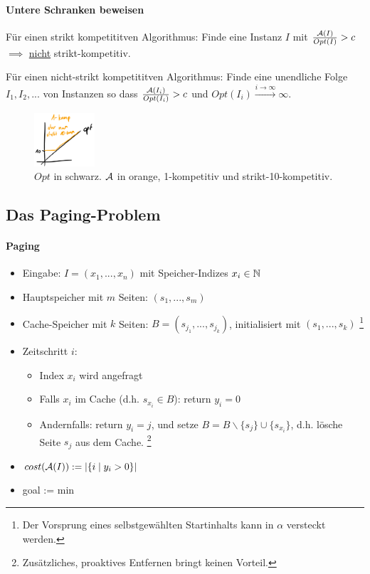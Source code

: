 \paragraph{Untere Schranken beweisen}
Für einen strikt kompetititven Algorithmus:
Finde eine Instanz $I$ mit $\frac{\mathcal{A}(I)}{Opt(I)} > c$ $\implies$ \underline{nicht} strikt-kompetitiv.

Für einen nicht-strikt kompetititven Algorithmus:
Finde eine unendliche Folge $I_1, I_2, ...$ von Instanzen so dass $\frac{\mathcal{A}(I_i)}{Opt(I_i)} > c$
und $Opt(I_i) \overset{i \rightarrow \infty}{\longrightarrow} \infty $.

\begin{figure}[h]
    \centering
    \includegraphics[width=0.2\textwidth]{images/strikt-kompetitiv.png}
    \caption{$Opt$ in schwarz. $\mathcal{A}$ in orange, 1-kompetitiv und strikt-10-kompetitiv.}
\end{figure}


\subsection{Das Paging-Problem}

\paragraph{Paging}
\begin{itemize}
    \item Eingabe: $ I = (x_1, ..., x_n)$ mit Speicher-Indizes $x_i \in \mathbb{N}$
    \item Hauptspeicher mit $m$ Seiten: $ (s_1, ..., s_m) $
    \item Cache-Speicher mit $k$ Seiten: $ B = (s_{j_1}, ..., s_{j_k}) $, initialisiert mit $ (s_1, ..., s_k) $
        \footnote{Der Vorsprung eines selbstgewählten Startinhalts kann in $\alpha$ versteckt werden.}
    \item Zeitschritt $i$:
    \begin{itemize}
        \item Index $x_i$ wird angefragt
        \item Falls $x_i$ im Cache (d.h. $s_{x_i} \in B$): return $y_i=0$
        \item Andernfalls: return $y_i=j$, und setze $B = B \backslash  \{s_j\} \cup \{s_{x_i}\} $,
            d.h. lösche Seite $s_j$ aus dem Cache.
            \footnote{Zusätzliches, proaktives Entfernen bringt keinen Vorteil.}
    \end{itemize}
    \item $ cost(\mathcal{A}(I)) := \vert \{ i \; | \; y_i > 0 \} \vert $
    \item goal := min
\end{itemize}

